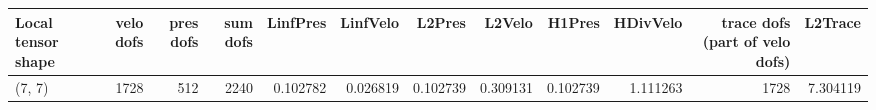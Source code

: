 \begin{tabular}{lrrrrrrrrrrr}
\toprule
Local tensor shape &  velo dofs &  pres dofs &  sum dofs &  LinfPres &  LinfVelo &   L2Pres &   L2Velo &   H1Pres &  HDivVelo &  trace dofs (part of velo dofs) &  L2Trace \\
\midrule
            (7, 7) &       1728 &        512 &      2240 &  0.102782 &  0.026819 & 0.102739 & 0.309131 & 0.102739 &  1.111263 &                            1728 & 7.304119 \\
\bottomrule
\end{tabular}
